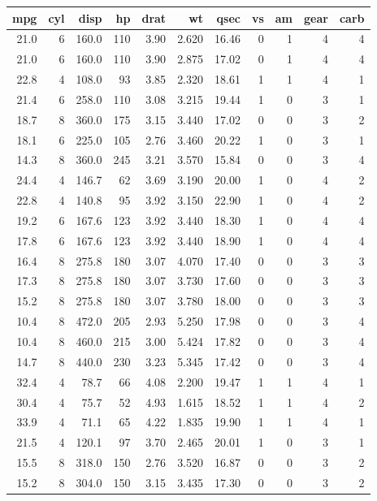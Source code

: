 \documentclass[a4paper, twoside]{templates/ociamthesis}
\begin{document}
\captionsetup[table]{labelformat=empty,skip=1pt}
\begin{longtable}{rrrrrrrrrrr}
\toprule
mpg & cyl & disp & hp & drat & wt & qsec & vs & am & gear & carb \\ 
\midrule
21.0 & 6 & 160.0 & 110 & 3.90 & 2.620 & 16.46 & 0 & 1 & 4 & 4 \\ 
21.0 & 6 & 160.0 & 110 & 3.90 & 2.875 & 17.02 & 0 & 1 & 4 & 4 \\ 
22.8 & 4 & 108.0 & 93 & 3.85 & 2.320 & 18.61 & 1 & 1 & 4 & 1 \\ 
21.4 & 6 & 258.0 & 110 & 3.08 & 3.215 & 19.44 & 1 & 0 & 3 & 1 \\ 
18.7 & 8 & 360.0 & 175 & 3.15 & 3.440 & 17.02 & 0 & 0 & 3 & 2 \\ 
18.1 & 6 & 225.0 & 105 & 2.76 & 3.460 & 20.22 & 1 & 0 & 3 & 1 \\ 
14.3 & 8 & 360.0 & 245 & 3.21 & 3.570 & 15.84 & 0 & 0 & 3 & 4 \\ 
24.4 & 4 & 146.7 & 62 & 3.69 & 3.190 & 20.00 & 1 & 0 & 4 & 2 \\ 
22.8 & 4 & 140.8 & 95 & 3.92 & 3.150 & 22.90 & 1 & 0 & 4 & 2 \\ 
19.2 & 6 & 167.6 & 123 & 3.92 & 3.440 & 18.30 & 1 & 0 & 4 & 4 \\ 
17.8 & 6 & 167.6 & 123 & 3.92 & 3.440 & 18.90 & 1 & 0 & 4 & 4 \\ 
16.4 & 8 & 275.8 & 180 & 3.07 & 4.070 & 17.40 & 0 & 0 & 3 & 3 \\ 
17.3 & 8 & 275.8 & 180 & 3.07 & 3.730 & 17.60 & 0 & 0 & 3 & 3 \\ 
15.2 & 8 & 275.8 & 180 & 3.07 & 3.780 & 18.00 & 0 & 0 & 3 & 3 \\ 
10.4 & 8 & 472.0 & 205 & 2.93 & 5.250 & 17.98 & 0 & 0 & 3 & 4 \\ 
10.4 & 8 & 460.0 & 215 & 3.00 & 5.424 & 17.82 & 0 & 0 & 3 & 4 \\ 
14.7 & 8 & 440.0 & 230 & 3.23 & 5.345 & 17.42 & 0 & 0 & 3 & 4 \\ 
32.4 & 4 & 78.7 & 66 & 4.08 & 2.200 & 19.47 & 1 & 1 & 4 & 1 \\ 
30.4 & 4 & 75.7 & 52 & 4.93 & 1.615 & 18.52 & 1 & 1 & 4 & 2 \\ 
33.9 & 4 & 71.1 & 65 & 4.22 & 1.835 & 19.90 & 1 & 1 & 4 & 1 \\ 
21.5 & 4 & 120.1 & 97 & 3.70 & 2.465 & 20.01 & 1 & 0 & 3 & 1 \\ 
15.5 & 8 & 318.0 & 150 & 2.76 & 3.520 & 16.87 & 0 & 0 & 3 & 2 \\ 
15.2 & 8 & 304.0 & 150 & 3.15 & 3.435 & 17.30 & 0 & 0 & 3 & 2 \\ 

\end{longtable}
\end{document}
